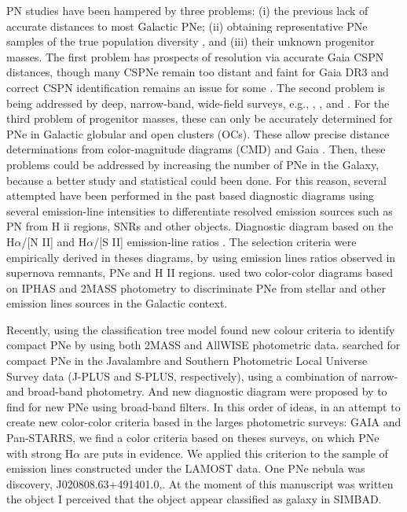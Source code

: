 \documentclass[fleqn,usenatbib]{mnras}
\begin{document}
PN studies have been hampered by three problems:
(i) the previous lack of accurate distances to most Galactic
PNe; (ii) obtaining representative PNe samples of the true
population diversity \citep{Parker:2022}, and (iii) their unknown
progenitor masses. The first problem has prospects of
resolution via accurate Gaia CSPN distances, though many
CSPNe remain too distant and faint for Gaia DR3 and correct
CSPN identification remains an issue for some \citep{Parker:2022}.
The second problem is being addressed by deep, narrow-band,
wide-field surveys, e.g., \citet{Parker:2005},
\citet{Drew:2005}, and \citet{Drew:2014}. For the third problem
of progenitor masses, these can only
be accurately determined for PNe in Galactic globular and
open clusters (OCs). These allow precise distance determinations
from color-magnitude diagrams (CMD) and Gaia \citep{Fragkou:2022}.
Then, these problems could be addressed by increasing the
number of PNe in the Galaxy, because a better study and statistical
could been done. For this reason, several attempted have been performed in the past
based diagnostic diagrams using several
emission-line intensities to differentiate resolved emission
sources such as PN from H {\sc ii} regions, SNRs and other objects.
Diagnostic diagram based on the H{$\alpha$}/[N II] and H{$\alpha$}/[S II]
emission-line ratios \citep{Sabbadin:1977, Fesen:1985, Riesgo:2006}.
The selection criteria were empirically derived in theses diagrams,
by using emission lines ratios observed in supernova remnants, PNe and H II regions.
\citet{Viironen:2009a, Viironen:2009b} used two color-color diagrams based on IPHAS
and 2MASS photometry to discriminate PNe from stellar and other emission lines sources
in the Galactic context. 

Recently, \citet{Akras:2019} using the classification tree model
found new colour criteria to identify compact PNe  by
using both 2MASS and AllWISE photometric data. \citet{Gutierrez:2020}
searched for compact PNe in the Javalambre and Southern Photometric Local
Universe Survey data (J-PLUS and S-PLUS, respectively), using a combination
of narrow- and broad-band photometry. And new diagnostic diagram were proposed
by \citet{Vejar:2019} to find for new PNe using broad-band filters.
In this order of ideas, in an attempt to create new color-color criteria based
in the larges photometric surveys: GAIA and Pan-STARRS, we find a color criteria
based on theses surveys, on which PNe with strong H{$\alpha$} are puts in
evidence. We applied this criterion to the sample of emission lines constructed
under the LAMOST data. One PNe nebula was discovery, J020808.63+491401.0,.
At the moment of this manuscript was written the object I perceived that the
object appear classified as galaxy in SIMBAD.
\end{document}
